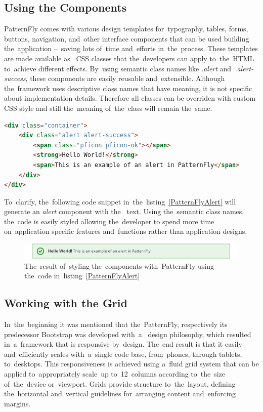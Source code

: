 \subsection{Using the Components}
PatternFly comes with various design templates for~typography, tables, forms,
buttons, navigation, and~other interface components that can be used building
the~application --~saving lots of~time and~efforts in~the~process. These
templates are made available as~ CSS classes that
the~developers can apply to~the~HTML to~achieve different effects.
By~using semantic class names like \textit{.alert} and~\textit{.alert-success},
these components are easily reusable and~extensible. Although the~framework uses
descriptive class names that have meaning, it is not specific about
implementation details. Therefore all classes can be overriden with custom
CSS style and still the~meaning of~the~class will remain
the~same.

\vspace{2mm}
\begin{lstlisting}[caption=An~example of~\textit{alert} implemented using
the~PatternFly framework.,language=HTML,label=PatternFlyAlert]
<div class="container">
	<div class="alert alert-success">
		<span class="pficon pficon-ok"></span>
		<strong>Hello World!</strong>
		<span>This is an example of an alert in PatternFly</span>
	</div>
</div>
\end{lstlisting}

To~clarify, the~following code snippet in~the~listing~\ref{PatternFlyAlert} will
generate an \textit{alert} component with the~ text. Using
the~semantic class names, the~code is easily styled allowing the~developer to
spend more time on~application specific features and~functions rather than
application designs.

\begin{figure}[!hbt]
	\centering
	\includegraphics[scale=0.7]{./obrazky-figures/patternfly-components.png}
	\caption{The~result of~styling the~components with~PatternFly using the~code
	in~listing~\ref{PatternFlyAlert}}
	\label{PatternFlyComponents}
\end{figure}

\subsection{Working with the Grid}
In~the~beginning it was mentioned that the~PatternFly, respectively its
predecessor Bootstrap was developed with~a~ design philosophy, which
resulted in~a~framework that is responsive by~design. The~end result is that it
easily and~efficiently scales with~a~single code base, from~phones, through
tablets, to~desktops. This responsiveness is achieved using a~fluid grid system
that can be applied to~appropriately scale~up to~12~columns according
to~the~size of~the~device or~viewport. Grids provide structure to~the~layout,
defining the~horizontal and~vertical guidelines for~arranging content
and~enforcing margins.

